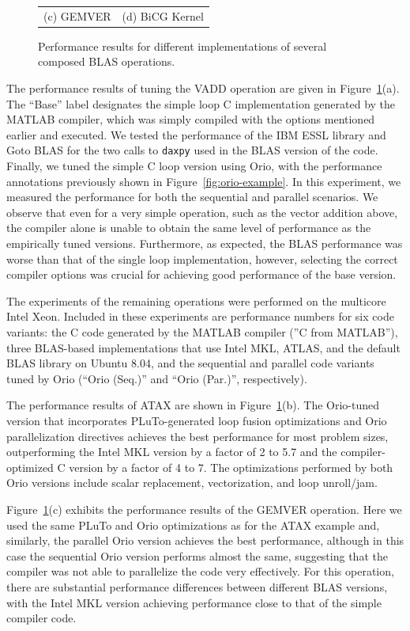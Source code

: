 \documentclass[runningheads]{llncs}
\begin{document}
\begin{figure}[htp]
{\begin{tabular}{cc}
(c) GEMVER & (d) BiCG Kernel \\

\end{tabular}
}
\caption{Performance results for different implementations of several composed BLAS operations.}
\label{fig:results}
\end{figure}

The performance results of tuning the VADD operation are given in
Figure~\ref{fig:results}(a). The ``Base'' label designates the simple
loop C implementation generated by the MATLAB compiler, which was
simply compiled with the options mentioned earlier and executed. We
tested the performance of the IBM ESSL library and Goto BLAS for the
two calls to \texttt{daxpy} used in the BLAS version of the code.
Finally, we tuned the simple C loop version using Orio, with the
performance annotations previously shown in
Figure~\ref{fig:orio-example}. In this experiment, we measured the
performance for both the sequential and parallel scenarios. We observe
that even for a very simple operation, such as the vector addition
above, the compiler alone is unable to obtain the same level of
performance as the empirically tuned versions. Furthermore, as
expected, the BLAS performance was worse than that of the single loop
implementation, however, selecting the correct compiler options was
crucial for achieving good performance of the base version.

The experiments of the remaining operations were performed on the
multicore Intel Xeon. Included in these experiments are performance
numbers for six code variants: the C code generated by the MATLAB
compiler (''C from MATLAB''), three BLAS-based implementations that
use Intel MKL, ATLAS, and the default BLAS library on Ubuntu 8.04, and
the sequential and parallel code variants tuned by Orio (``Orio
(Seq.)'' and ``Orio (Par.)'', respectively).

The performance results of ATAX are shown in
Figure~\ref{fig:results}(b). The Orio-tuned version that incorporates
PLuTo-generated loop fusion optimizations and Orio parallelization
directives achieves the best performance for most problem sizes,
outperforming the Intel MKL version by a factor of 2 to 5.7 and the
compiler-optimized C version by a factor of 4 to 7. The optimizations
performed by both Orio versions include scalar replacement,
vectorization, and loop unroll/jam.

Figure~\ref{fig:results}(c) exhibits the performance results of the
GEMVER operation. Here we used the same PLuTo and Orio optimizations
as for the ATAX example and, similarly, the parallel Orio version
achieves the best performance, although in this case the sequential
Orio version performs almost the same, suggesting that the compiler was
not able to parallelize the code very effectively. For this operation,
there are substantial performance differences between different BLAS
versions, with the Intel MKL version achieving performance close to
that of the simple compiler code.
\end{document}
